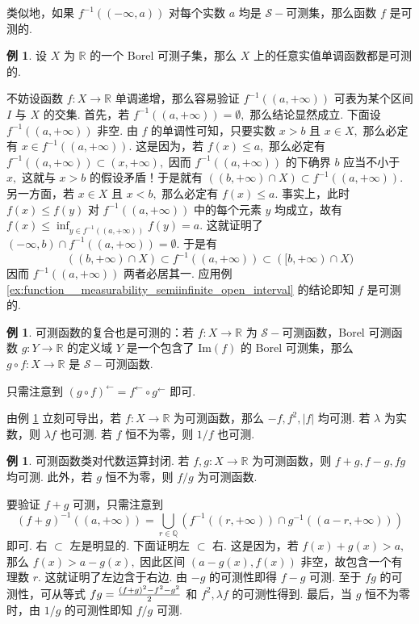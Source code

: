 \documentclass[12pt, a4paper, oneside]{book}
\numberwithin{figure}{section}
\theoremstyle{definition}
\newtheorem{example}[theorem]{例}
\begin{document}
类似地，如果 $f^{-1}((-\infty,a))$ 对每个实数 $a$ 均是 $\mathcal S-$可测集，那么函数 $f$ 是可测的.

\begin{example}
    设 $X$ 为 $\mathbb R$ 的一个 Borel 可测子集，那么 $X$ 上的任意实值单调函数都是可测的.
\end{example}
不妨设函数 $f:X\to\mathbb R$ 单调递增，那么容易验证 $f^{-1}((a,+\infty))$ 可表为某个区间 $I$ 与 $X$ 的交集. 首先，若 $f^{-1}((a,+\infty))=\emptyset,$ 那么结论显然成立. 下面设 $f^{-1}((a,+\infty))$ 非空. 
由 $f$ 的单调性可知，只要实数 $x>b$ 且 $x\in X,$ 那么必定有 $x\in f^{-1}((a,+\infty)).$ 这是因为，若 $f(x)\leq a,$ 那么必定有 $f^{-1}((a,+\infty))\subset (x,+\infty),$ 因而 
$f^{-1}((a,+\infty))$ 的下确界 $b$ 应当不小于 $x,$ 这就与 $x>b$ 的假设矛盾！于是就有 $((b,+\infty)\cap X)\subset f^{-1}((a,+\infty)).$ 
另一方面，若 $x\in X$ 且 $x<b,$ 那么必定有 $f(x)\leq a.$ 事实上，此时 $f(x)\leq f(y)$ 对 $f^{-1}((a,+\infty))$ 中的每个元素 $y$ 均成立，故有 $f(x)\leq \inf_{y\in f^{-1}((a,+\infty))}f(y)=a.$ 这就证明了 $(-\infty,b)\cap f^{-1}((a,+\infty))=\emptyset.$ 于是有
\begin{equation}
    ((b,+\infty)\cap X)\subset f^{-1}((a,+\infty))\subset ([b,+\infty)\cap X)
\end{equation}
因而 $f^{-1}((a,+\infty))$ 两者必居其一. 应用例 \ref{ex:function__measurability_semiinfinite_open_interval} 的结论即知 $f$ 是可测的.

\begin{example}\label{ex:composition_of_measurable_functions}
    可测函数的复合也是可测的：若 $f:X\to\mathbb R$ 为 $\mathcal S-$可测函数，Borel 可测函数 $g:Y\to\mathbb R$ 的定义域 $Y$ 是一个包含了 $\mathrm{Im}(f)$ 的 Borel 可测集，那么 $g\circ f:X\to\mathbb R$ 是 $\mathcal S-$可测函数.
\end{example}
只需注意到 $(g\circ f)^\leftarrow=f^\leftarrow\circ g^\leftarrow$ 即可.

由例 \ref{ex:composition_of_measurable_functions} 立刻可导出，若 $f:X\to\mathbb R$ 为可测函数，那么 $-f,f^2,|f|$ 均可测. 若 $\lambda$ 为实数，则 $\lambda f$ 也可测. 若 $f$ 恒不为零，则 $1/f$ 也可测.


\begin{example}
    可测函数类对代数运算封闭. 若 $f,g:X\to\mathbb R$ 为可测函数，则 $f+g,f-g,fg$ 均可测. 此外，若 $g$ 恒不为零，则 $f/g$ 为可测函数.
\end{example}
要验证 $f+g$ 可测，只需注意到 
\begin{equation}
    (f+g)^{-1}((a,+\infty))=\bigcup_{r\in\mathbb Q}\left(f^{-1}((r,+\infty))\cap g^{-1}((a-r,+\infty))\right)
\end{equation}
即可. 右 $\subset$ 左是明显的. 下面证明左 $\subset$ 右.
这是因为，若 $f(x)+g(x)>a,$ 那么 $f(x)>a-g(x),$ 因此区间 $(a-g(x),f(x))$ 非空，故包含一个有理数 $r.$ 这就证明了左边含于右边.
由 $-g$ 的可测性即得 $f-g$ 可测. 至于 $fg$ 的可测性，可从等式 $fg = {(f+g)^2-f^2-g^2\over 2}$ 和 $f^2,\lambda f$ 的可测性得到. 
最后，当 $g$ 恒不为零时，由 $1/g$ 的可测性即知 $f/g$ 可测.
\end{document}
